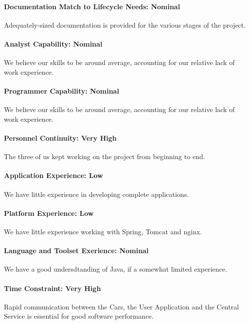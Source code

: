 \paragraph*{Documentation Match to Lifecycle Needs: Nominal}
Adequately-sized documentation is provided for the various stages of the project.

\paragraph*{Analyst Capability: Nominal}
We believe our skills to be around average, accounting for our relative lack of work experience.

\paragraph*{Programmer Capability: Nominal}
We believe our skills to be around average, accounting for our relative lack of work experience.

\paragraph*{Personnel Continuity: Very High}
The three of us kept working on the project from beginning to end.

\paragraph*{Application Experience: Low}
We have little experience in developing complete applications.

\paragraph*{Platform Experience: Low}
We have little experience working with Spring, Tomcat and nginx.

\paragraph*{Language and Toolset Exerience: Nominal}
We have a good undersdtanding of Java, if a somewhat limited experience.

\paragraph*{Time Constraint: Very High}
Rapid communication between the Cars, the User Application and the Central Service is essential for good software performance.

